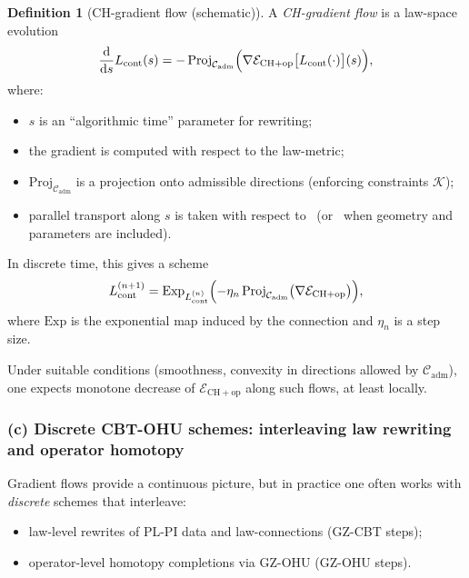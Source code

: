 \documentclass[11pt]{book}
\theoremstyle{plain}
\theoremstyle{definition}
\newtheorem{definition}[theorem]{Definition} \theoremstyle{remark}
\begin{document}
\begin{definition}[CH-gradient flow (schematic)]
  A \emph{CH-gradient flow} is a law-space evolution
  \[
    \frac{\mathrm{d}}{\mathrm{d}s}L_{\mathrm{cont}}(s)
    =
    -\,\mathrm{Proj}_{\mathcal{C}_{\mathrm{adm}}}
      \Bigl(
        \nabla\mathcal{E}_{\mathrm{CH+op}}
          \bigl[L_{\mathrm{cont}}(\cdot)\bigr](s)
      \Bigr),
  \]
  where:
  \begin{itemize}
    \item $s$ is an “algorithmic time” parameter for rewriting;
    \item the gradient is computed with respect to the law-metric;
    \item $\mathrm{Proj}_{\mathcal{C}_{\mathrm{adm}}}$ is a projection
          onto admissible directions (enforcing constraints $\mathcal{K}$);
    \item parallel transport along $s$ is taken with respect to
          \GZLOC\ (or \GZTLC\ when geometry and parameters are included).
  \end{itemize}
\end{definition}

In discrete time, this gives a scheme
\[
  L_{\mathrm{cont}}^{(n+1)}
  =
  \mathrm{Exp}_{L_{\mathrm{cont}}^{(n)}}
   \Bigl(
     -\eta_n\,
      \mathrm{Proj}_{\mathcal{C}_{\mathrm{adm}}}
        \bigl(\nabla\mathcal{E}_{\mathrm{CH+op}}\bigr)
   \Bigr),
\]
where $\mathrm{Exp}$ is the exponential map induced by the connection
and $\eta_n$ is a step size.

Under suitable conditions (smoothness, convexity in directions allowed
by $\mathcal{C}_{\mathrm{adm}}$), one expects monotone decrease of
$\mathcal{E}_{\mathrm{CH+op}}$ along such flows, at least locally.



\subsubsection*{(c) Discrete CBT-OHU schemes: interleaving law rewriting and operator homotopy}

Gradient flows provide a continuous picture, but in practice one often
works with \emph{discrete} schemes that interleave:

\begin{itemize}
  \item law-level rewrites of PL-PI data and law-connections
        (GZ-CBT steps);
  \item operator-level homotopy completions via GZ-OHU (GZ-OHU steps).
\end{itemize}
\end{document}
